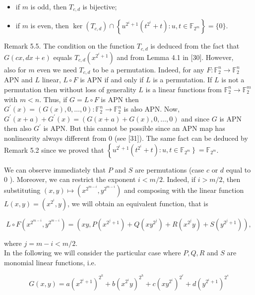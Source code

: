 \documentclass[10pt]{article}
\begin{document}
\begin{itemize}
  \item if $m$ is odd, then $T_{c, d}$ is bijective;
  \item if $m$ is even, then $\operatorname{ker}\left(T_{c, d}\right) \cap\left\{u^{2^{i}+1}\left(t^{2^{i}}+t\right): u, t \in \mathbb{F}_{2^{m}}\right\}=\{0\}$.
\end{itemize}

Remark 5.5. The condition on the function $T_{c, d}$ is deduced from the fact that $G(c x, d x+e)$ equals $T_{c, d}\left(x^{2^{i}+1}\right)$ and from Lemma 4.1 in [30]. However,\\
also for $m$ even we need $T_{c, d}$ to be a permutation. Indeed, for any $F: \mathbb{F}_{2}^{n} \rightarrow \mathbb{F}_{2}^{n}$ APN and $L$ linear, $L \circ F$ is APN if and only if $L$ is a permutation. If $L$ is not a permutation then without loss of generality $L$ is a linear functions from $\mathbb{F}_{2}^{n} \rightarrow \mathbb{F}_{2}^{m}$ with $m<n$. Thus, if $G=L \circ F$ is APN then $G^{\prime}(x)=(G(x), 0, \ldots, 0): \mathbb{F}_{2}^{n} \rightarrow \mathbb{F}_{2}^{n}$ is also APN. Now, $G^{\prime}(x+a)+G^{\prime}(x)=(G(x+a)+G(x), 0, \ldots, 0)$ and since $G$ is APN then also $G^{\prime}$ is APN. But this cannot be possible since an APN map has nonlinearity always different from 0 (see [31]). The same fact can be deduced by Remark 5.2 since we proved that $\left\{u^{2^{i}+1}\left(t^{2^{i}}+t\right): u, t \in\right. \left.\mathbb{F}_{2^{m}}\right\}=\mathbb{F}_{2^{m}}$.

We can observe immediately that $P$ and $S$ are permutations (case $c$ or $d$ equal to 0 ). Moreover, we can restrict the exponent $i<m / 2$. Indeed, if $i>m / 2$, then substituting $(x, y) \mapsto\left(x^{2^{m-i}}, y^{2^{m-i}}\right)$ and composing with the linear function $L(x, y)=\left(x^{2^{i}}, y\right)$, we will obtain an equivalent function, that is

$$
L \circ F\left(x^{2^{m-i}}, y^{2^{m-i}}\right)=\left(x y, P\left(x^{2^{j}+1}\right)+Q\left(x y^{2^{j}}\right)+R\left(x^{2^{j}} y\right)+S\left(y^{2^{j}+1}\right)\right),
$$

where $j=m-i<m / 2$.\\
In the following we will consider the particular case where $P, Q, R$ and $S$ are monomial linear functions, i.e.

$$
G(x, y)=a\left(x^{2^{i}+1}\right)^{2^{k}}+b\left(x^{2^{i}} y\right)^{2^{h}}+c\left(x y^{2^{i}}\right)^{2^{r}}+d\left(y^{2^{i}+1}\right)^{2^{s}}
$$
\end{document}
